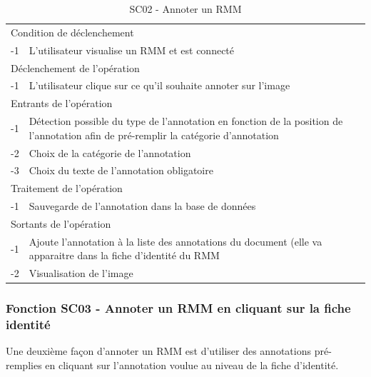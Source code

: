 \documentclass[a4paper]{article}
\begin{document}
\begin{table}[H]
  \centering
   \small
	\begin{tabular}{|c|p{12cm}|}
   		\hline
   			\rowcolor{lightgray}\multicolumn{2}{|c|}{\textbf{SC02 - Annoter un RMM}} \\
   		\hline
   			\multicolumn{2}{|l|}{Condition de d\'eclenchement} \\
   		\hline
   			-1 & L'utilisateur visualise un RMM et est connecté\\
   		\hline
   			\multicolumn{2}{|l|}{D\'eclenchement de l'op\'eration} \\
   		\hline
   			-1 & L’utilisateur clique sur ce qu’il souhaite annoter sur l’image\\
   		\hline
   			\multicolumn{2}{|l|}{Entrants de l'op\'eration} \\
   		\hline
   			-1 & Détection possible du type de l’annotation en fonction de la position de l'annotation afin de pré-remplir la catégorie d’annotation\\
            -2 & Choix de la catégorie de l’annotation \\
			-3 & Choix du texte de l’annotation obligatoire \\
   		\hline
   			\multicolumn{2}{|l|}{Traitement de l'op\'eration} \\
  		\hline
   			-1 & Sauvegarde de l’annotation dans la base de données\\
   		\hline
   			\multicolumn{2}{|l|}{Sortants de l'op\'eration} \\
   		\hline
   			-1 & Ajoute l’annotation à la liste des annotations du document (elle va apparaitre dans la fiche d’identité du RMM\\
			-2 & Visualisation de l’image\\
   		\hline
	\end{tabular}
  \caption{SC02 - Annoter un RMM}
  \normalsize
  \label{tab:annoter_registre}
\end{table}

\subsubsection{Fonction SC03 - Annoter un RMM en cliquant sur la fiche identité}
Une deuxième façon d’annoter un RMM est d’utiliser des annotations pré-remplies en cliquant sur l’annotation voulue au niveau de la fiche d’identité.\\
\end{document}
